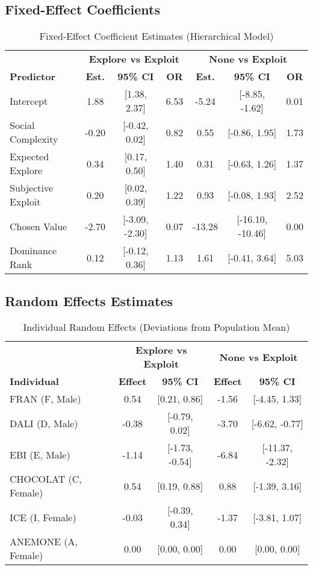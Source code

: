 \documentclass[11pt,a4paper]{article}
\begin{document}
\subsection{Fixed-Effect Coefficients}

\begin{table}[H]
\centering
\caption{Fixed-Effect Coefficient Estimates (Hierarchical Model)}
\begin{tabular}{lcccccc}
\toprule
& \multicolumn{3}{c}{\textbf{Explore vs Exploit}} & \multicolumn{3}{c}{\textbf{None vs Exploit}} \\
\cmidrule(lr){2-4} \cmidrule(lr){5-7}
\textbf{Predictor} & \textbf{Est.} & \textbf{95\% CI} & \textbf{OR} & \textbf{Est.} & \textbf{95\% CI} & \textbf{OR} \\
\midrule
Intercept & 1.88 & [1.38, 2.37] & 6.53 & -5.24 & [-8.85, -1.62] & 0.01 \\
Social Complexity & -0.20 & [-0.42, 0.02] & 0.82 & 0.55 & [-0.86, 1.95] & 1.73 \\
Expected Explore & 0.34 & [0.17, 0.50] & 1.40 & 0.31 & [-0.63, 1.26] & 1.37 \\
Subjective Exploit & 0.20 & [0.02, 0.39] & 1.22 & 0.93 & [-0.08, 1.93] & 2.52 \\
Chosen Value & -2.70 & [-3.09, -2.30] & 0.07 & -13.28 & [-16.10, -10.46] & 0.00 \\
Dominance Rank & 0.12 & [-0.12, 0.36] & 1.13 & 1.61 & [-0.41, 3.64] & 5.03 \\
\bottomrule
\end{tabular}
\end{table}

\subsection{Random Effects Estimates}

\begin{table}[H]
\centering
\caption{Individual Random Effects (Deviations from Population Mean)}
\begin{tabular}{lcccc}
\toprule
& \multicolumn{2}{c}{\textbf{Explore vs Exploit}} & \multicolumn{2}{c}{\textbf{None vs Exploit}} \\
\cmidrule(lr){2-3} \cmidrule(lr){4-5}
\textbf{Individual} & \textbf{Effect} & \textbf{95\% CI} & \textbf{Effect} & \textbf{95\% CI} \\
\midrule
FRAN (F, Male) & 0.54 & [0.21, 0.86] & -1.56 & [-4.45, 1.33] \\
DALI (D, Male) & -0.38 & [-0.79, 0.02] & -3.70 & [-6.62, -0.77] \\
EBI (E, Male) & -1.14 & [-1.73, -0.54] & -6.84 & [-11.37, -2.32] \\
CHOCOLAT (C, Female) & 0.54 & [0.19, 0.88] & 0.88 & [-1.39, 3.16] \\
ICE (I, Female) & -0.03 & [-0.39, 0.34] & -1.37 & [-3.81, 1.07] \\
ANEMONE (A, Female) & 0.00 & [0.00, 0.00] & 0.00 & [0.00, 0.00] \\
\bottomrule
\end{tabular}
\end{table}
\end{document}
